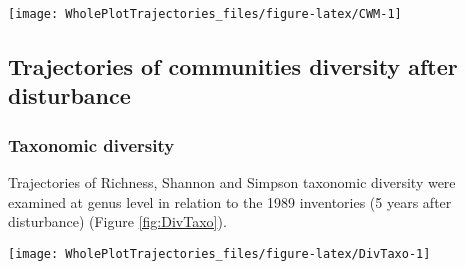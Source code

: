\documentclass[fleqn,10pt]{ArtEcoFoG} %
\theoremstyle{definition}
\theoremstyle{definition}
\theoremstyle{definition}
\theoremstyle{remark}
\begin{document}
\begin{figure*}

{\centering \texttt{[image: WholePlotTrajectories\_files/figure-latex/CWM-1]} 

}

\caption{Trajectories of the communities weighted means (CWM) over 30 years after disturbance of 4 leaf traits (Leaf thickness, \emph{L\_thickness}, chlorophyll content, \emph{L\_chloro}, toughness, \emph{L\_toughness} and specific area, \emph{SLA}), 2 stem traits (wood specific gravity, \emph{WD}, and bark thickness, \emph{Bark-thick}) and one life trait (Specific maximum height at adult stage, \emph{Hmax}). Trajectories correspond to the median (solid line) and 0.025 and 0.975 percentile (gray envelope) observed after 50 iteration of the taxonomic uncertainty propagation and the missing trait value filling processes. Initial treatments are represented by solid lines colors with green for control, blue for T1,orange for T2 and red for T3.}\label{fig:CWM}
\end{figure*}

\subsection{Trajectories of communities diversity after
disturbance}\label{trajectories-of-communities-diversity-after-disturbance}

\subsubsection{Taxonomic diversity}\label{taxonomic-diversity}

Trajectories of Richness, Shannon and Simpson taxonomic diversity were
examined at genus level in relation to the 1989 inventories (5 years
after disturbance) (Figure \ref{fig:DivTaxo}).

\begin{figure*}

{\centering \texttt{[image: WholePlotTrajectories\_files/figure-latex/DivTaxo-1]} 

}

\caption{Trajectories of the difference to the 1989 inventories (5 years after disturbance) over 30 years after disturbance of plots communities \textbf{(a)} Richness, \textbf{(b)} Shannon and \textbf{(c)} Simpson diversities. Trajectories correspond to the median (solid line) and 0.025 and 0.975 percentile (gray envelope) observed after 50 iteration of the taxonomic uncertainty propagation. Initial treatments are represented by solid lines colors with green for control, blue for T1,orange for T2 and red for T3.}\label{fig:DivTaxo}
\end{figure*}
\end{document}
